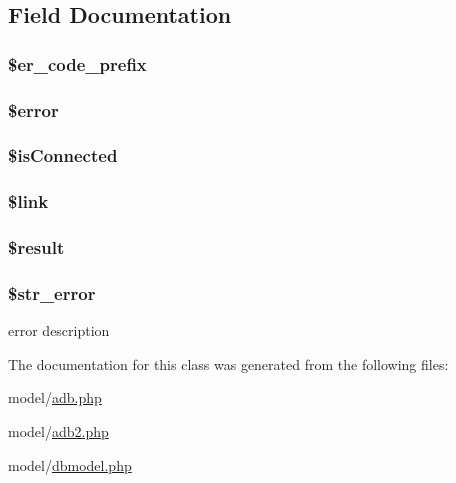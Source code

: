 \subsection{Field Documentation}
\hypertarget{classadb_a5f07d1228c8616196d4c6f81527a1124}{}
\subsubsection[{\$er\+\_\+code\+\_\+prefix}]{\setlength{\rightskip}{0pt plus 5cm}\$er\+\_\+code\+\_\+prefix}\label{classadb_a5f07d1228c8616196d4c6f81527a1124}
\hypertarget{classadb_aeba2ab722cedda53dbb7ec1a59f45550}{}
\subsubsection[{\$error}]{\setlength{\rightskip}{0pt plus 5cm}\${\bf error}}\label{classadb_aeba2ab722cedda53dbb7ec1a59f45550}
\hypertarget{classadb_a50ceed0b08e9ad3dcaecc2ac188b2047}{}
\subsubsection[{\$is\+Connected}]{\setlength{\rightskip}{0pt plus 5cm}\$is\+Connected}\label{classadb_a50ceed0b08e9ad3dcaecc2ac188b2047}
\hypertarget{classadb_a5d346e31b75d916e3bac9cb193bfc97f}{}
\subsubsection[{\$link}]{\setlength{\rightskip}{0pt plus 5cm}\$link}\label{classadb_a5d346e31b75d916e3bac9cb193bfc97f}
\hypertarget{classadb_a112ef069ddc0454086e3d1e6d8d55d07}{}
\subsubsection[{\$result}]{\setlength{\rightskip}{0pt plus 5cm}\$result}\label{classadb_a112ef069ddc0454086e3d1e6d8d55d07}
\hypertarget{classadb_a6aa71d68e5c4977c83c8b75748e08999}{}
\subsubsection[{\$str\+\_\+error}]{\setlength{\rightskip}{0pt plus 5cm}\$str\+\_\+error}\label{classadb_a6aa71d68e5c4977c83c8b75748e08999}
error description 

The documentation for this class was generated from the following files\+:\begin{DoxyCompactItemize}
\item 
model/\hyperlink{adb_8php}{adb.\+php}\item 
model/\hyperlink{adb2_8php}{adb2.\+php}\item 
model/\hyperlink{dbmodel_8php}{dbmodel.\+php}\end{DoxyCompactItemize}
